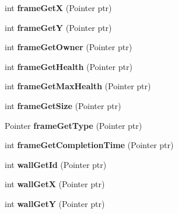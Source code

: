 \begin{DoxyCompactItemize}
\item 
\hypertarget{interfaceClient_a252186ed4cc10f4b5b454a25e80b434c}{
int {\bfseries frameGetX} (Pointer ptr)}
\label{interfaceClient_a252186ed4cc10f4b5b454a25e80b434c}

\item 
\hypertarget{interfaceClient_a1ed27cb94e12e4ffe6feb61d882cc797}{
int {\bfseries frameGetY} (Pointer ptr)}
\label{interfaceClient_a1ed27cb94e12e4ffe6feb61d882cc797}

\item 
\hypertarget{interfaceClient_acea7d919211876275a0a4a6b3d0f48f3}{
int {\bfseries frameGetOwner} (Pointer ptr)}
\label{interfaceClient_acea7d919211876275a0a4a6b3d0f48f3}

\item 
\hypertarget{interfaceClient_ad12d4e32ddd9d30231662e0ad65c211c}{
int {\bfseries frameGetHealth} (Pointer ptr)}
\label{interfaceClient_ad12d4e32ddd9d30231662e0ad65c211c}

\item 
\hypertarget{interfaceClient_a81f933c54e095fb0a51f3d597f9bd707}{
int {\bfseries frameGetMaxHealth} (Pointer ptr)}
\label{interfaceClient_a81f933c54e095fb0a51f3d597f9bd707}

\item 
\hypertarget{interfaceClient_ac463b7d5596075cfa51829822a2e4cfe}{
int {\bfseries frameGetSize} (Pointer ptr)}
\label{interfaceClient_ac463b7d5596075cfa51829822a2e4cfe}

\item 
\hypertarget{interfaceClient_aa1955b6ccb6051b5a0a09379048a55da}{
Pointer {\bfseries frameGetType} (Pointer ptr)}
\label{interfaceClient_aa1955b6ccb6051b5a0a09379048a55da}

\item 
\hypertarget{interfaceClient_acd5872ceb93196d686e904cbdd0b86c8}{
int {\bfseries frameGetCompletionTime} (Pointer ptr)}
\label{interfaceClient_acd5872ceb93196d686e904cbdd0b86c8}

\item 
\hypertarget{interfaceClient_adc44cd9ed0cc462c6576ff35e406f23d}{
int {\bfseries wallGetId} (Pointer ptr)}
\label{interfaceClient_adc44cd9ed0cc462c6576ff35e406f23d}

\item 
\hypertarget{interfaceClient_a291c594db2be551af7ff999d2c111808}{
int {\bfseries wallGetX} (Pointer ptr)}
\label{interfaceClient_a291c594db2be551af7ff999d2c111808}

\item 
\hypertarget{interfaceClient_a988f1bfc1d29bcb75f321d2ff655515a}{
int {\bfseries wallGetY} (Pointer ptr)}
\label{interfaceClient_a988f1bfc1d29bcb75f321d2ff655515a}


\end{DoxyCompactItemize}
